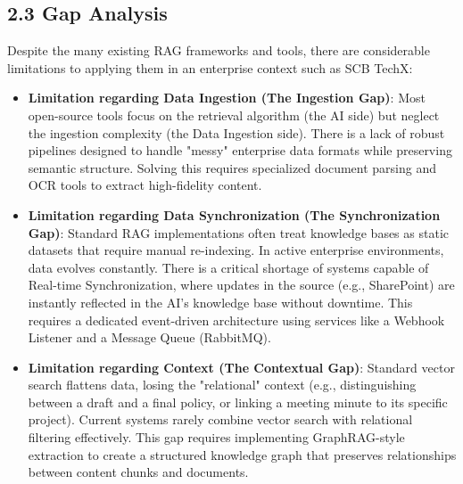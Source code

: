 \documentclass[12pt]{article}
\begin{document}
\subsection{2.3 Gap Analysis}
Despite the many existing RAG frameworks and tools, there are considerable limitations to applying them in an enterprise context such as SCB TechX:
\begin{itemize}
    \item \textbf{Limitation regarding Data Ingestion (The Ingestion Gap)}: Most open-source tools focus on the retrieval algorithm (the AI side) but neglect the ingestion complexity (the Data Ingestion side). There is a lack of robust pipelines designed to handle "messy" enterprise data formats while preserving semantic structure. Solving this requires specialized document parsing and OCR tools to extract high-fidelity content.
    \item \textbf{Limitation regarding Data Synchronization (The Synchronization Gap)}: Standard RAG implementations often treat knowledge bases as static datasets that require manual re-indexing. In active enterprise environments, data evolves constantly. There is a critical shortage of systems capable of Real-time Synchronization, where updates in the source (e.g., SharePoint) are instantly reflected in the AI's knowledge base without downtime. This requires a dedicated event-driven architecture using services like a Webhook Listener and a Message Queue (RabbitMQ).
    \item \textbf{Limitation regarding Context (The Contextual Gap)}: Standard vector search flattens data, losing the "relational" context (e.g., distinguishing between a draft and a final policy, or linking a meeting minute to its specific project). Current systems rarely combine vector search with relational filtering effectively. This gap requires implementing GraphRAG-style extraction to create a structured knowledge graph that preserves relationships between content chunks and documents.
\end{itemize}
\end{document}
